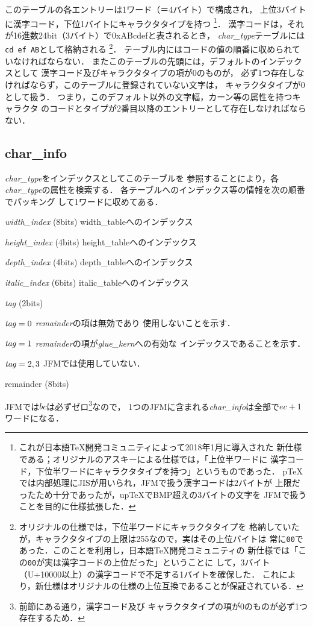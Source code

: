 \documentclass[a4paper,11pt,nomag]{jsarticle}
\begin{document}
このテーブルの各エントリーは1ワード（＝4バイト）で構成され，
上位3バイトに漢字コード，下位1バイトにキャラクタタイプを持つ
\footnote{これが日本語\TeX{}開発コミュニティによって2018年1月に導入された
新仕様である；オリジナルのアスキーによる仕様では，「上位半ワードに
漢字コード，下位半ワードにキャラクタタイプを持つ」というものであった．
p\TeX{}では内部処理にJISが用いられ，JFMで扱う漢字コードは2バイトが
上限だったため十分であったが，up\TeX{}でBMP超えの3バイトの文字を
JFMで扱うことを目的に仕様拡張した．}．
漢字コードは，それが16進数24bit（3バイト）で0xABcdefと表されるとき，
{\it char\_type}テーブルには{\tt cd ef AB}として格納される
\footnote{オリジナルの仕様では，下位半ワードにキャラクタタイプを
格納していたが，キャラクタタイプの上限は255なので，実はその上位バイトは
常に{\tt 00}であった．このことを利用し，日本語\TeX{}開発コミュニティの
新仕様では「この{\tt 00}が実は漢字コードの上位だった」ということに
して，3バイト（U+10000以上）の漢字コードで不足する1バイトを確保した．
これにより，新仕様はオリジナルの仕様の上位互換であることが保証されている．}．
テーブル内にはコードの値の順番に収められていなければならない．
またこのテーブルの先頭には，デフォルトのインデックスとして
漢字コード及びキャラクタタイプの項が0のものが，
必ず1つ存在しなければならず，このテーブルに登録されていない文字は，
キャラクタタイプが0として扱う．
つまり，このデフォルト以外の文字幅，カーン等の属性を持つキャラクタ
のコードとタイプが2番目以降のエントリーとして存在しなければならない．

\subsection{char\_info}
{\it char\_type}をインデックスとしてこのテーブルを
参照することにより，各{\it char\_type}の属性を検索する．
各テーブルへのインデックス等の情報を次の順番でパッキング
して1ワードに収めてある．
\begin{description}
\item{{\it width\_index} (8bits)} width\_tableへのインデックス
\item{{\it height\_index} (4bits)} height\_tableへのインデックス
\item{{\it depth\_index} (4bits)} depth\_tableへのインデックス
\item{{\it italic\_index} (6bits)} italic\_tableへのインデックス
\item{{\it tag} (2bits)}
	\begin{description}
	\item{${\it tag}=0$} {\it remainder}の項は無効であり
		使用しないことを示す．
	\item{${\it tag}=1$} {\it remainder}の項が{\it glue\_kern}への有効な
		インデックスであることを示す．
	\item{${\it tag}=2, 3$} JFMでは使用していない．
	\end{description}
\item{remainder (8bits)}
\end{description}
JFMでは$bc$は必ずゼロ\footnote{前節にある通り，漢字コード及び
キャラクタタイプの項が0のものが必ず1つ存在するため．}なので，
1つのJFMに含まれる{\it char\_info}は全部で$ec+1$ワードになる．
\end{document}

